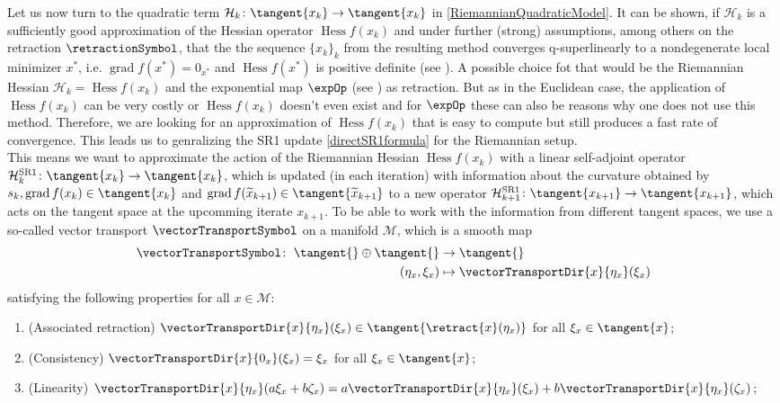 Let us now turn to the quadratic term $\mathcal{H}_k \colon \tangent{x_k} \to \tangent{x_k}$ in \cref{RiemannianQuadraticModel}. It can be shown, if $\mathcal{H}_k$ is a sufficiently good approximation of the Hessian operator $\operatorname{Hess} f(x_k)$ and under further (strong) assumptions, among others on the retraction $\retractionSymbol$, that the the sequence $\{ x_k \}_k$ from the resulting method converges q-superlinearly to a nondegenerate local minimizer $x^*$, i.e. $\operatorname{grad} f(x^*) = 0_{x^*}$ and $\operatorname{Hess} f(x^*)$ is positive definite (see \cite[Theorem~7.4.11]{AbsilMahonySepulchre:2008}). A possible choice fot that would be the Riemannian Hessian $\mathcal{H}_k = \operatorname{Hess} f(x_k)$ and the exponential map $\expOp$ (see \cite[p.~102]{AbsilMahonySepulchre:2008}) as retraction. But as in the Euclidean case, the application of $\operatorname{Hess} f(x_k)$ can be very costly or $\operatorname{Hess} f(x_k)$ doesn't even exist and for $\expOp$ these can also be reasons why one does not use this method. Therefore, we are looking for an approximation of $\operatorname{Hess} f(x_k)$ that is easy to compute but still produces a fast rate of convergence. This leads us to genralizing the SR1 update \cref{directSR1formula} for the Riemannian setup. \\
This means we want to approximate the action of the Riemannian Hessian $\operatorname{Hess} f(x_k)$ with a linear self-adjoint operator $\mathcal{H}^\mathrm{SR1}_k \colon \tangent{x_k} \to \tangent{x_k}$, which is updated (in each iteration) with information about the curvature obtained by $s_k, \operatorname{grad} f(x_k) \in \tangent{x_k}$ and $\operatorname{grad} f(\widetilde{x}_{k+1}) \in \tangent{\widetilde{x}_{k+1}}$ to a new operator $\mathcal{H}^\mathrm{SR1}_{k+1} \colon \tangent{x_{k+1}} \to \tangent{x_{k+1}}$, which acts on the tangent space at the upcomming iterate $x_{k+1}$. To be able to work with the information from different tangent spaces, we use a so-called vector transport $\vectorTransportSymbol$ on a manifold $\mathcal{M}$, which is a smooth map 
\begin{align*}
    \vectorTransportSymbol \colon \; \tangent{} \oplus \tangent{} & \to \tangent{} \\
    (\eta_x, \xi_x) & \mapsto \vectorTransportDir{x}{\eta_x}(\xi_x)
\end{align*}      
satisfying the following properties for all $x \in \mathcal{M}$:
\begin{enumerate}
    \item (Associated retraction) $\vectorTransportDir{x}{\eta_x}(\xi_x) \in \tangent{\retract{x}(\eta_x)}$ for all $\xi_x \in \tangent{x}$;
    \item (Consistency) $\vectorTransportDir{x}{0_x}(\xi_x) = \xi_x$ for all $\xi_x \in \tangent{x}$;
    \item (Linearity) $\vectorTransportDir{x}{\eta_x}(a \xi_x + b \zeta_x) = a \vectorTransportDir{x}{\eta_x}(\xi_x) + b \vectorTransportDir{x}{\eta_x}(\zeta_x)$;
\end{enumerate}
